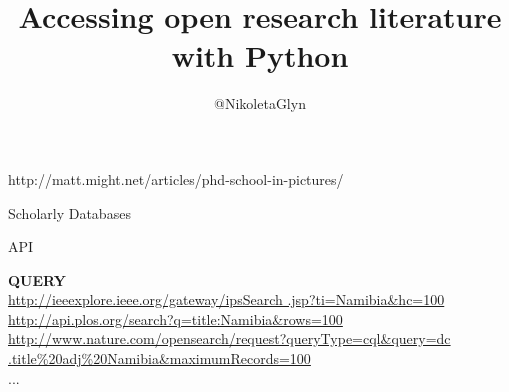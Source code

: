 \documentclass{beamer}
\title{Accessing open research literature with Python}
\author{@NikoletaGlyn}
\date{ }
\institute[]
{
\begin{center}
    \texttt{[image: static/cardiff\_uni\_logo.jpg]}
\end{center}
}
\begin{document}
\frame{\titlepage}

\begin{frame}
    \begin{center}
    
\tiny{http://matt.might.net/articles/phd-school-in-pictures/}
    \end{center}
\end{frame}


\begin{frame}
    \begin{center}
    \huge{Scholarly Databases}
    \end{center}
\end{frame}

\begin{frame}
    \begin{center}
    \huge{API}
    \end{center}
\end{frame}

\begin{frame}[fragile]
    \begin{center}
    \textbf{QUERY} \\
    \vspace{3mm}
    \small{\url{http://ieeexplore.ieee.org/gateway/ipsSearch
    .jsp?ti=Namibia&hc=100}} \\
    \pause
    \vspace{10mm}
    \small{\url{http://api.plos.org/search?q=title:Namibia&rows=100}} \\
    \pause
    \vspace{10mm}
    \small{\url{http://www.nature.com/opensearch/request?queryType=cql&query=dc
    .title%
    \small{...}
    \end{center}
\end{frame}

\begin{frame}
    \begin{center}
    
    \end{center}
\end{frame}
\begin{frame}
    \begin{center}
    
    \end{center}
\end{frame}
\end{document}
